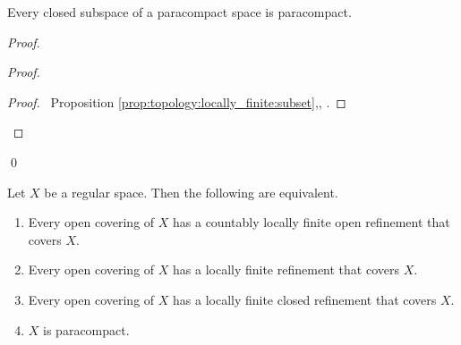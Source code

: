 \begin{thm}
  \label{thm:topology:paracompact:closed_subspace}
Every closed subspace of a paracompact space is paracompact.
\end{thm}

\begin{proof}
\pf
{}
\begin{proof}
  \begin{proof}
    \pf\ Proposition \ref{prop:topology:locally_finite:subset},, .
  \end{proof}
\end{proof}
\qed
\end{proof}

\begin{lm}[E. Michael (AC)]
\label{lm:topology:paracompact:michaels_lemma}
Let $X$ be a regular space. Then the following are equivalent.
\begin{enumerate}
  \item
  \label{one}
  Every open covering of $X$ has a countably locally finite open refinement that covers $X$.
  \item
  \label{two}
  Every open covering of $X$ has a locally finite refinement that covers $X$.
  \item
  \label{three}
  Every open covering of $X$ has a locally finite closed refinement that covers $X$.
  \item
  \label{four}
  $X$ is paracompact.
\end{enumerate}
\end{lm}

